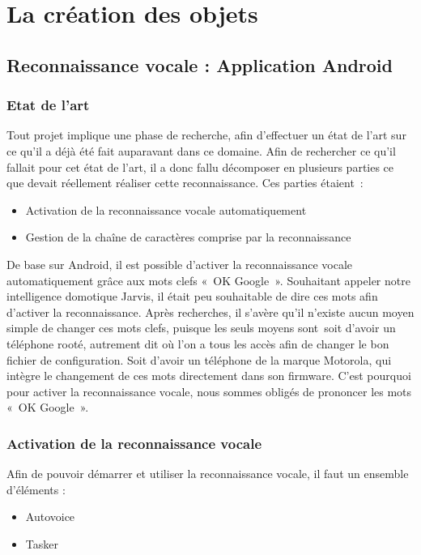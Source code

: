 \chapter{La création des objets}

\section{Reconnaissance vocale : Application Android}
	\subsection{Etat de l’art}	
Tout projet implique une phase de recherche, afin d'effectuer un état de l'art sur ce qu'il a déjà été fait 
auparavant dans ce domaine. Afin de rechercher ce qu'il fallait pour cet état de l'art, il a donc fallu 
décomposer en plusieurs parties ce que devait réellement réaliser cette reconnaissance. Ces parties étaient :

\begin{itemize}
\item Activation de la reconnaissance vocale automatiquement
\item Gestion de la chaîne de caractères comprise par la reconnaissance
\end{itemize}

De base sur Android, il est possible d'activer la reconnaissance vocale  automatiquement grâce aux mots clefs 
« OK Google ». Souhaitant appeler notre intelligence domotique Jarvis, il était peu souhaitable de dire ces 
mots afin d'activer la reconnaissance.
Après recherches, il s'avère qu'il n'existe aucun moyen simple de changer ces mots clefs, puisque les seuls 
moyens sont soit d'avoir un téléphone rooté, autrement dit où l'on a tous les accès afin de changer le bon 
fichier de configuration. Soit d'avoir un téléphone de la marque Motorola, qui intègre le changement de ces 
mots directement dans son firmware. C'est pourquoi pour activer la reconnaissance vocale, nous sommes obligés 
de prononcer les mots « OK Google ».
	
	\subsection{Activation de la reconnaissance vocale}
	
Afin de pouvoir démarrer et utiliser la reconnaissance vocale, il faut un ensemble d'éléments :
\begin{itemize}
 \item Autovoice
 \item Tasker
\end{itemize}


